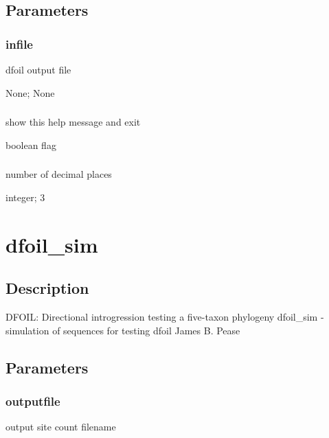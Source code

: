 \documentclass[letterpaper,12pt,english]{sphinxmanual}
\begin{document}
\subsection{Parameters}
\label{\detokenize{prog_desc:parameters}}

\subsubsection{infile}
\label{\detokenize{prog_desc:infile}}
 dfoil output file

 None;  None


\subsubsection{}
\label{\detokenize{prog_desc:h-help}}
 show this help message and exit

 boolean flag


\subsubsection{}
\label{\detokenize{prog_desc:ndigits}}
 number of decimal places

 integer;  3


\section{dfoil\_sim}
\label{\detokenize{prog_desc:dfoil-sim}}

\subsection{Description}
\label{\detokenize{prog_desc:id1}}
DFOIL: Directional introgression testing a five-taxon phylogeny
dfoil\_sim - simulation of sequences for testing dfoil
James B. Pease


\subsection{Parameters}
\label{\detokenize{prog_desc:id2}}

\subsubsection{outputfile}
\label{\detokenize{prog_desc:outputfile}}
  output site count filename
\end{document}
